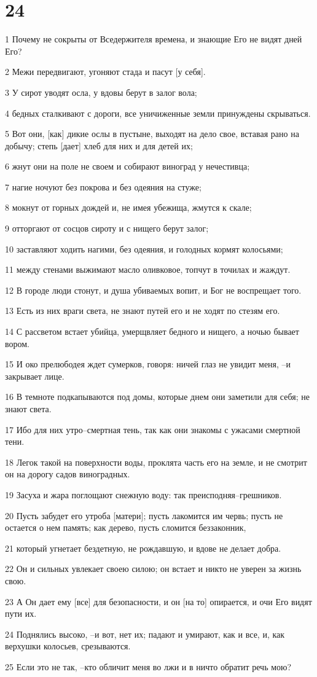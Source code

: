 \chapter{24}

\par 1 Почему не сокрыты от Вседержителя времена, и знающие Его не видят дней Его?
\par 2 Межи передвигают, угоняют стада и пасут [у себя].
\par 3 У сирот уводят осла, у вдовы берут в залог вола;
\par 4 бедных сталкивают с дороги, все уничиженные земли принуждены скрываться.
\par 5 Вот они, [как] дикие ослы в пустыне, выходят на дело свое, вставая рано на добычу; степь [дает] хлеб для них и для детей их;
\par 6 жнут они на поле не своем и собирают виноград у нечестивца;
\par 7 нагие ночуют без покрова и без одеяния на стуже;
\par 8 мокнут от горных дождей и, не имея убежища, жмутся к скале;
\par 9 отторгают от сосцов сироту и с нищего берут залог;
\par 10 заставляют ходить нагими, без одеяния, и голодных кормят колосьями;
\par 11 между стенами выжимают масло оливковое, топчут в точилах и жаждут.
\par 12 В городе люди стонут, и душа убиваемых вопит, и Бог не воспрещает того.
\par 13 Есть из них враги света, не знают путей его и не ходят по стезям его.
\par 14 С рассветом встает убийца, умерщвляет бедного и нищего, а ночью бывает вором.
\par 15 И око прелюбодея ждет сумерков, говоря: ничей глаз не увидит меня, --и закрывает лице.
\par 16 В темноте подкапываются под домы, которые днем они заметили для себя; не знают света.
\par 17 Ибо для них утро--смертная тень, так как они знакомы с ужасами смертной тени.
\par 18 Легок такой на поверхности воды, проклята часть его на земле, и не смотрит он на дорогу садов виноградных.
\par 19 Засуха и жара поглощают снежную воду: так преисподняя--грешников.
\par 20 Пусть забудет его утроба [матери]; пусть лакомится им червь; пусть не остается о нем память; как дерево, пусть сломится беззаконник,
\par 21 который угнетает бездетную, не рождавшую, и вдове не делает добра.
\par 22 Он и сильных увлекает своею силою; он встает и никто не уверен за жизнь свою.
\par 23 А Он дает ему [все] для безопасности, и он [на то] опирается, и очи Его видят пути их.
\par 24 Поднялись высоко, --и вот, нет их; падают и умирают, как и все, и, как верхушки колосьев, срезываются.
\par 25 Если это не так, --кто обличит меня во лжи и в ничто обратит речь мою?


